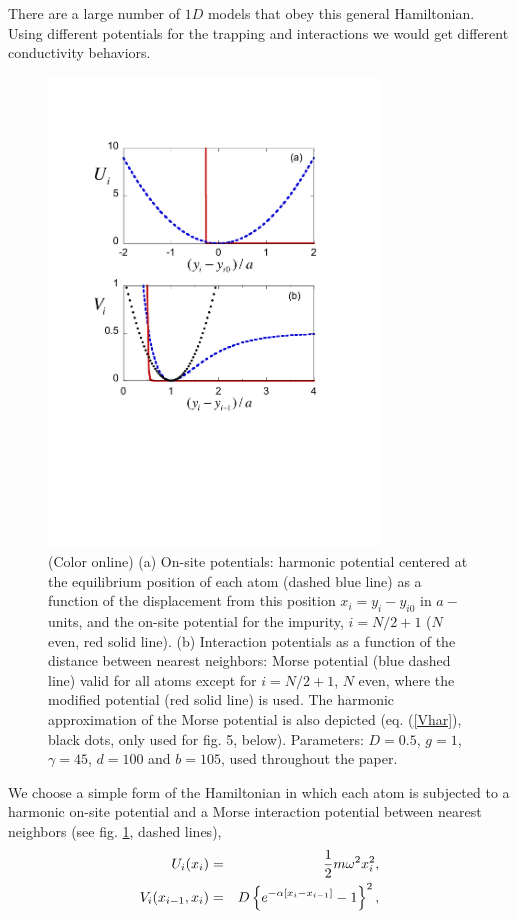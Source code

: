 There are a large number of $1D$ models that obey this general Hamiltonian. Using different potentials for the trapping and interactions we would get different conductivity behaviors.
\begin{figure}
\centering
\includegraphics[width=8.8cm]{Figures/FIG1.pdf}
\caption{(Color online) (a) On-site potentials: harmonic potential centered at the equilibrium position of each atom (dashed blue line) as a function of the displacement from this position $x_i=y_i-y_{i0}$ in $a-$units, and the on-site potential for the impurity, $i=N/2+1$
($N$ even, red solid line). (b) Interaction potentials as a function of the distance between nearest neighbors: Morse potential
(blue dashed line) valid for all atoms except for $i=N/2+1$, $N$ even, where the modified potential (red solid line) is used.
The harmonic approximation of the Morse potential is also depicted (eq. (\ref{Vhar}), black dots, only used for fig. 5, below).
Parameters: $D=0.5$, $g=1$, $\gamma = 45$, $d=100$ and $b=105$, used throughout the paper.
}
\label{figure1}
\end{figure}
%
We choose a simple form of the Hamiltonian in
which each atom is subjected to a harmonic on-site potential and a Morse interaction potential between nearest neighbors (see fig. \ref{figure1}, dashed lines),
%
\begin{eqnarray}
\label{HO}
U_i(x_i)&=&{1 \over 2} m \omega^2 x^2_i,
\\
\label{IH}
V_i(x_{i-1},x_i)&=&D\left \{e^{-\alpha [x_i-x_{i-1}]}-1\right \}^2,
\end{eqnarray}
